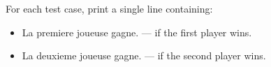 For each test case, print a single line containing:

\begin{itemize}
    \item La premiere joueuse gagne. --- if the first player wins.
    \item La deuxieme joueuse gagne. --- if the second player wins.
\end{itemize}
